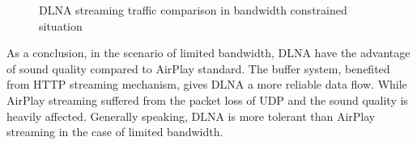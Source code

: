 \begin{figure}[hb]%
\caption{DLNA streaming traffic comparison in
bandwidth constrained situation\label{dlna_traffic_bw_1}}
\end{figure}
\clearpage
As a conclusion, in the scenario of limited bandwidth, DLNA have the advantage of sound quality compared to AirPlay standard. The buffer system, benefited from HTTP streaming mechanism, gives DLNA a more reliable data flow. While AirPlay streaming suffered from the packet loss of UDP and the sound quality is heavily affected. Generally speaking, DLNA is more tolerant than AirPlay streaming in the case of limited bandwidth.
